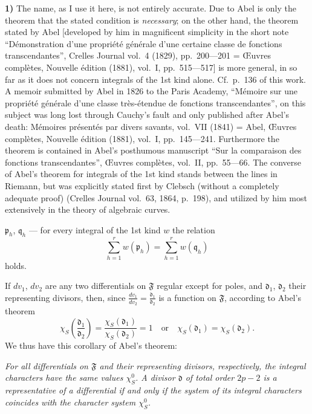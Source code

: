 \documentclass{article}
\begin{document}
\textbf{1)} The name, as I use it here, is not entirely accurate. Due to Abel is only the theorem that the stated condition is \emph{necessary}; on the other hand, the theorem stated by Abel [developed by him in magnificent simplicity in the short note ``Démonstration d'une propriété générale d'une certaine classe de fonctions transcendantes'', Crelles Journal vol.~4 (1829), pp.~200---201 = Œuvres complètes, Nouvelle édition (1881), vol.~I, pp.~515---517] is more general, in so far as it does not concern integrals of the 1st kind alone. Cf.\ p.~136 of this work. A memoir submitted by Abel in 1826 to the Paris Academy, ``Mémoire sur une propriété générale d'une classe très-étendue de fonctions transcendantes'', on this subject was long lost through Cauchy's fault and only published after Abel's death: Mémoires présentés par divers savants, vol.~VII (1841) = Abel, Œuvres complètes, Nouvelle édition (1881), vol.~I, pp.~145---241. Furthermore the theorem is contained in Abel's posthumous manuscript ``Sur la comparaison des fonctions transcendantes'', Œuvres complètes, vol.~II, pp.~55---66. The converse of Abel's theorem for integrals of the 1st kind stands between the lines in Riemann, but was explicitly stated first by Clebsch (without a completely adequate proof) (Crelles Journal vol.~63, 1864, p.~198), and utilized by him most extensively in the theory of algebraic curves.

$\mathfrak{p}_h$, $\mathfrak{q}_h$ --- for every integral of the 1st kind $w$ the relation
\[ \sum_{h=1}^r w(\mathfrak{p}_h) = \sum_{h=1}^r w(\mathfrak{q}_h) \]
holds.

If $dv_1$, $dv_2$ are any two differentials on $\mathfrak{F}$ regular except for poles, and $\mathfrak{d}_1$, $\mathfrak{d}_2$ their representing divisors, then, since $\frac{dv_1}{dv_2} = \frac{\mathfrak{d}_1}{\mathfrak{d}_2}$ is a function on $\mathfrak{F}$, according to Abel's theorem
\[ \chi_S\left( \frac{\mathfrak{d}_1}{\mathfrak{d}_2} \right) = \frac{\chi_S(\mathfrak{d}_1)}{\chi_S(\mathfrak{d}_2)} = 1 \quad\text{or}\quad \chi_S(\mathfrak{d}_1) = \chi_S(\mathfrak{d}_2). \]
We thus have this corollary of Abel's theorem:

\emph{For all differentials on $\mathfrak{F}$ and their representing divisors, respectively, the integral characters have the same values $\chi_S^0$. A divisor $\mathfrak{d}$ of total order $2p - 2$ is a representative of a differential if and only if the system of its integral characters coincides with the character system $\chi_S^0$.}
\end{document}
